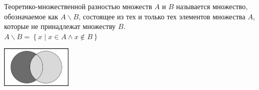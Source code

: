 \begin{definition}
    Теоретико-множественной разностью множеств $A$ и $B$ называется множество, обозначаемое как $A \backslash B$, состоящее из тех и только тех элементов 
    множества $A$, которые не принадлежат множеству $B$. \\ 

    $A \backslash B = \left\{ x \mid x \in A \land x \notin B \right\}$

    \begin{center}
        \includegraphics[width=0.25\textwidth]{tex/chapter_2/assets/Subtraction.png}\\
    \end{center}
\end{definition}

\newpage